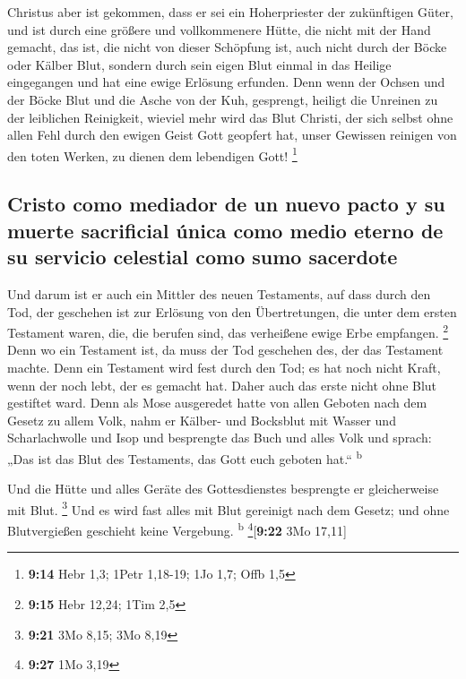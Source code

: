  Christus aber ist gekommen, dass er sei ein
Hoherpriester der zukünftigen Güter, und ist durch eine größere und
vollkommenere Hütte, die nicht mit der Hand gemacht, das ist, die nicht
von dieser Schöpfung ist,  auch nicht durch der Böcke
oder Kälber Blut, sondern durch sein eigen Blut einmal in das Heilige
eingegangen und hat eine ewige Erlösung erfunden.  Denn
wenn der Ochsen und der Böcke Blut und die Asche von der Kuh, gesprengt,
heiligt die Unreinen zu der leiblichen Reinigkeit, 
wieviel mehr wird das Blut Christi, der sich selbst ohne allen Fehl
durch den ewigen Geist Gott geopfert hat, unser Gewissen reinigen von
den toten Werken, zu dienen dem lebendigen Gott! \footnote{\textbf{9:14}
  Hebr 1,3; 1Petr 1,18-19; 1Jo 1,7; Offb 1,5}

\hypertarget{cristo-como-mediador-de-un-nuevo-pacto-y-su-muerte-sacrificial-uxfanica-como-medio-eterno-de-su-servicio-celestial-como-sumo-sacerdote}{%
\subsection{Cristo como mediador de un nuevo pacto y su muerte
sacrificial única como medio eterno de su servicio celestial como sumo
sacerdote}\label{cristo-como-mediador-de-un-nuevo-pacto-y-su-muerte-sacrificial-uxfanica-como-medio-eterno-de-su-servicio-celestial-como-sumo-sacerdote}}

 Und darum ist er auch ein Mittler des neuen Testaments,
auf dass durch den Tod, der geschehen ist zur Erlösung von den
Übertretungen, die unter dem ersten Testament waren, die, die berufen
sind, das verheißene ewige Erbe empfangen. \footnote{\textbf{9:15} Hebr
  12,24; 1Tim 2,5}  Denn wo ein Testament ist, da muss
der Tod geschehen des, der das Testament machte.  Denn
ein Testament wird fest durch den Tod; es hat noch nicht Kraft, wenn der
noch lebt, der es gemacht hat.  Daher auch das erste
nicht ohne Blut gestiftet ward.  Denn als Mose ausgeredet
hatte von allen Geboten nach dem Gesetz zu allem Volk, nahm er Kälber-
und Bocksblut mit Wasser und Scharlachwolle und Isop und besprengte das
Buch und alles Volk  und sprach: „Das ist das Blut des
Testaments, das Gott euch geboten hat.`` \textsuperscript{b}

 Und die Hütte und alles Geräte des Gottesdienstes
besprengte er gleicherweise mit Blut. \footnote{\textbf{9:21} 3Mo 8,15;
  3Mo 8,19}  Und es wird fast alles mit Blut gereinigt
nach dem Gesetz; und ohne Blutvergießen geschieht keine Vergebung.
\textsuperscript{b} \footnote{\textbf{9:27} 1Mo 3,19}{[}\textbf{9:22}
3Mo 17,11{]}

